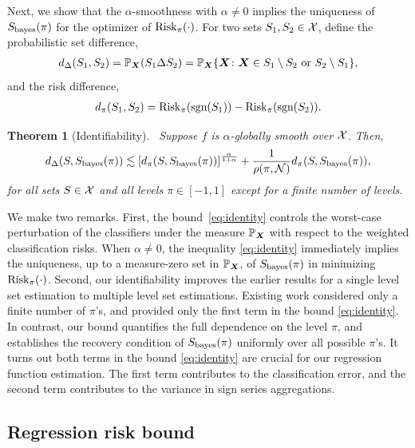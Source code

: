 \documentclass[11pt]{article}
\theoremstyle{plain}
\newtheorem{thm}{Theorem}[section]
\theoremstyle{definition}
\def\sign{\textup{sgn}}
\def\bayesS{S_{\textup{bayes}}}
\def\risk{\textup{Risk}_\pi}
\begin{document}
Next, we show that the $\alpha$-smoothness with $\alpha\neq 0$ implies the uniqueness of $\bayesS(\pi)$ for the optimizer of $\risk(\cdot)$. For two sets $S_1, S_2\in \mathcal{X}$, define the probabilistic set difference, 
\begin{align*} 
d_{\Delta}(S_1,S_2) = \mathbb{P}_{\bm X}(S_1\Delta S_2)=\mathbb{P}_{\bm X}\{\bm X\colon \bm X\in S_1\setminus S_2 \text{ or }S_2\setminus S_1\},
\end{align*}
and the risk difference,
\begin{align*} 
d_\pi(S_1,S_2) = \risk(\sign(S_1))-\risk(\sign(S_2)).
\end{align*}

\begin{thm}[Identifiability]~\label{thm:identifiability} Suppose $f$ is $\alpha$-globally smooth over $\mathcal{X}$. Then,
\begin{align}\label{eq:identity}
d_{\Delta}(S,\bayesS(\pi)) \lesssim \left[d_\pi(S,\bayesS(\pi))\right]^{\alpha\over 1+\alpha}+{1\over\rho(\pi, \tN)} d_\pi(S,\bayesS(\pi)),
\end{align}
for all sets $S\in\mathcal{X}$ and all levels $\pi\in[-1,1]$ except for a finite number of levels.
\end{thm}

\noindent
We make two remarks. First, the bound~\eqref{eq:identity} controls the worst-case perturbation of the classifiers under the measure $\mathbb{P}_{\bm X}$ with respect to the weighted classification risks. When $\alpha \neq 0$, the inequality \eqref{eq:identity} immediately implies the uniqueness, up to a measure-zero set in $\mathbb{P}_{\bm X}$, of $\bayesS(\pi)$ in minimizing $\risk(\cdot)$. Second, our identifiability improves the earlier results for a single level set estimation to multiple level set estimations. Existing work \citep{singh2009adaptive,xu2020class} considered only a finite number of $\pi$'s, and provided only the first term in the bound \eqref{eq:identity}. In contrast, our bound quantifies the full dependence on the level $\pi$, and establishes the recovery condition of $\bayesS(\pi)$ uniformly over all possible $\pi$'s. It turns out both terms in the bound \eqref{eq:identity} are crucial for our regression function estimation. The first term contributes to the classification error, and the second term contributes to the variance in sign series aggregations. 



\subsection{Regression risk bound}
\end{document}
